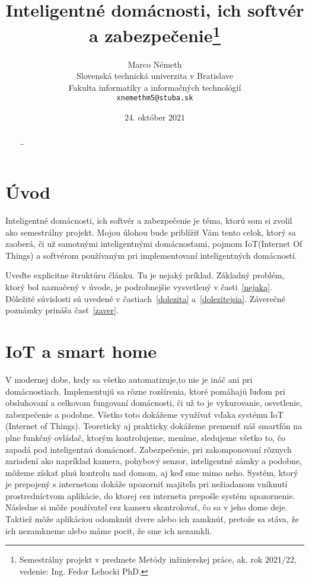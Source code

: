 \documentclass[10pt,twoside,slovak,a4paper]{article}
\title{Inteligentné domácnosti, ich softvér a zabezpečenie\thanks{Semestrálny projekt v predmete Metódy inžinierskej práce, ak. rok 2021/22, vedenie: Ing. Fedor Lehocki PhD.}} %
\author{Marco Németh\\[2pt]
	{\small Slovenská technická univerzita v Bratislave}\\
	{\small Fakulta informatiky a informačných technológií}\\
	{\small \texttt{xnemethm5@stuba.sk}}
	}
\date{\small 24. október 2021} %
\begin{document}
\maketitle

\begin{abstract}
\ldots
\end{abstract}



\section{Úvod}

Inteligentné domácnosti, ich softvér a zabezpečenie je téma, ktorú som si zvolil ako semestrálny projekt. Mojou úlohou bude priblížiť Vám tento celok, ktorý sa zaoberá, či už samotnými inteligentnými domácnosťami, pojmom IoT(Internet Of Things) a softvérom používaným pri implementovaní inteligentných domácností.

Uveďte explicitne štruktúru článku. Tu je nejaký príklad.
Základný problém, ktorý bol naznačený v úvode, je podrobnejšie vysvetlený v časti~\ref{nejaka}.
Dôležité súvislosti sú uvedené v častiach~\ref{dolezita} a~\ref{dolezitejsia}.
Záverečné poznámky prináša časť~\ref{zaver}.

\section{IoT a smart home}

V modernej dobe, kedy sa všetko automatizuje,to nie je ináč ani pri domácnostiach. Implementujú sa rôzne rozšírenia, ktoré pomáhajú ľuďom pri obsluhovaní a celkovom fungovaní domácnosti, či už to je vykurovanie, osvetlenie, zabezpečenie a podobne. Všetko toto dokážeme využívať vďaka systému IoT (Internet of Things). Teoreticky aj prakticky dokážeme premeniť náš smartfón na plne funkčný ovládač, ktorým kontrolujeme, meníme, sledujeme všetko to, čo zapadá pod inteligentnú domácnosť.  Zabezpečenie, pri zakomponovaní rôznych zariadení ako napríklad kamera, pohybový senzor, inteligentné zámky a podobne, môžeme získať plnú kontrolu nad domom, aj keď sme mimo neho. Systém, ktorý je prepojený s internetom dokáže upozorniť majiteľa pri nežiadanom vniknutí prostredníctvom aplikácie, do ktorej cez internetu prepošle systém upozornenie. Následne si môže používateľ cez kameru skontrolovať, čo sa v jeho dome deje. Taktiež môže aplikáciou odomknúť dvere alebo ich zamknúť, pretože sa stáva, že ich nezamkneme alebo máme pocit, že sme ich nezamkli.
\end{document}
